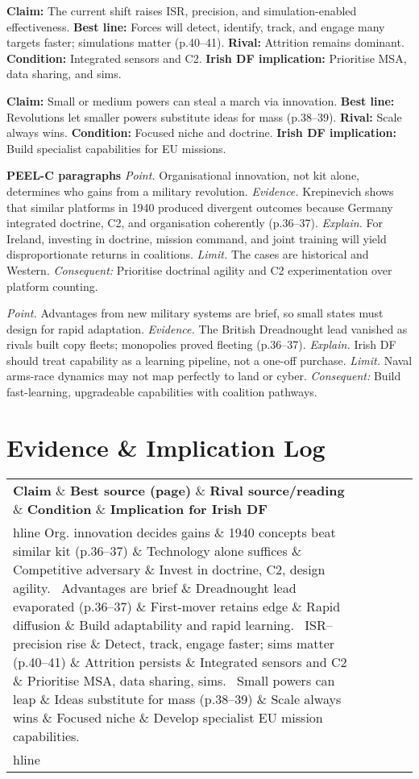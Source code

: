 \textbf{Claim:} The current shift raises ISR, precision, and simulation-enabled effectiveness. \textbf{Best line:} Forces will detect, identify, track, and engage many targets faster; simulations matter (p.40–41). \textbf{Rival:} Attrition remains dominant. \textbf{Condition:} Integrated sensors and C2. \textbf{Irish DF implication:} Prioritise MSA, data sharing, and sims.

\textbf{Claim:} Small or medium powers can steal a march via innovation. \textbf{Best line:} Revolutions let smaller powers substitute ideas for mass (p.38–39). \textbf{Rival:} Scale always wins. \textbf{Condition:} Focused niche and doctrine. \textbf{Irish DF implication:} Build specialist capabilities for EU missions.

\textbf{PEEL-C paragraphs}
\textit{Point.} Organisational innovation, not kit alone, determines who gains from a military revolution. \textit{Evidence.} Krepinevich shows that similar platforms in 1940 produced divergent outcomes because Germany integrated doctrine, C2, and organisation coherently (p.36–37). \textit{Explain.} For Ireland, investing in doctrine, mission command, and joint training will yield disproportionate returns in coalitions. \textit{Limit.} The cases are historical and Western. \textit{Consequent:} Prioritise doctrinal agility and C2 experimentation over platform counting.

\textit{Point.} Advantages from new military systems are brief, so small states must design for rapid adaptation. \textit{Evidence.} The British Dreadnought lead vanished as rivals built copy fleets; monopolies proved fleeting (p.36–37). \textit{Explain.} Irish DF should treat capability as a learning pipeline, not a one-off purchase. \textit{Limit.} Naval arms-race dynamics may not map perfectly to land or cyber. \textit{Consequent:} Build fast-learning, upgradeable capabilities with coalition pathways.


\section*{Evidence \& Implication Log}
\begin{tabular}{p{3.2cm}p{4.2cm}p{3.6cm}p{3.2cm}p{4.2cm}}
	\textbf{Claim} \& \textbf{Best source (page)} \& \textbf{Rival source/reading} \& \textbf{Condition} \& \textbf{Implication for Irish DF}\\hline
	Org. innovation decides gains \& 1940 concepts beat similar kit (p.36–37) \& Technology alone suffices \& Competitive adversary \& Invest in doctrine, C2, design agility. \
	Advantages are brief \& Dreadnought lead evaporated (p.36–37) \& First-mover retains edge \& Rapid diffusion \& Build adaptability and rapid learning. \
	ISR–precision rise \& Detect, track, engage faster; sims matter (p.40–41) \& Attrition persists \& Integrated sensors and C2 \& Prioritise MSA, data sharing, sims. \
	Small powers can leap \& Ideas substitute for mass (p.38–39) \& Scale always wins \& Focused niche \& Develop specialist EU mission capabilities. \\hline
\end{tabular}

